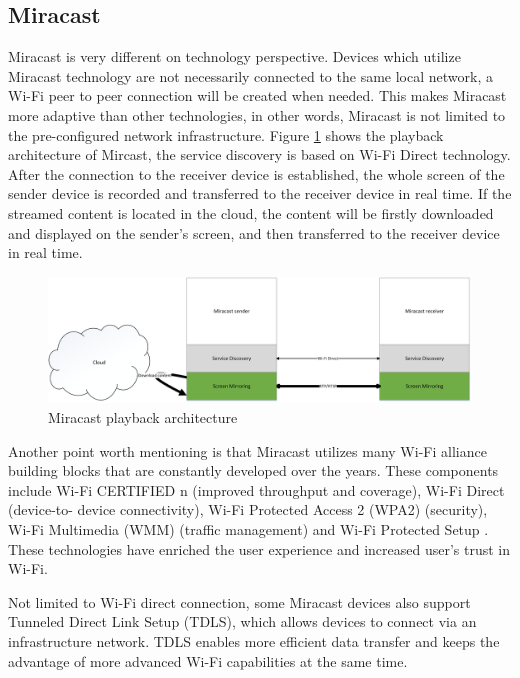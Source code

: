 \subsection{Miracast\label{2_2_5}} %
Miracast \cite{miracast_industry} is very different on technology perspective.
Devices which utilize Miracast technology are not necessarily connected to
the same local network, a Wi-Fi peer to peer connection will be created when
needed. This makes Miracast more adaptive than other technologies, in other
words, Miracast is not limited to the pre-configured network infrastructure.
Figure \ref{miracast_use_scenario} shows the playback architecture of Mircast, the
service discovery is based on Wi-Fi Direct technology. After the connection to
the receiver device is established, the whole screen of the sender device is
recorded and transferred to the receiver device in real time. If the streamed
content is located in the cloud, the content will be firstly downloaded and
displayed on the sender's screen, and then transferred to the receiver device in
real time.

\begin{figure}[htb] 
\centering \includegraphics[width=1\columnwidth]{charts/miracast} 
\caption{Miracast playback architecture\label{miracast_use_scenario}} 
\end{figure}  

Another point worth mentioning is that Miracast utilizes many Wi-Fi alliance
building blocks that are constantly developed over the years. These components
include Wi-Fi CERTIFIED n (improved throughput and coverage), Wi-Fi Direct
(device-to- device connectivity), Wi-Fi Protected Access 2 (WPA2) (security),
Wi-Fi Multimedia (WMM) (traffic management) and Wi-Fi Protected
Setup \cite{miracast_industry}. These technologies have enriched the user
experience and increased user's trust in Wi-Fi.

Not limited to Wi-Fi direct connection, some Miracast devices also support Tunneled Direct Link Setup (TDLS), which allows devices to connect via an infrastructure network. TDLS enables more efficient data transfer and keeps the advantage of more advanced Wi-Fi capabilities at the same time.

